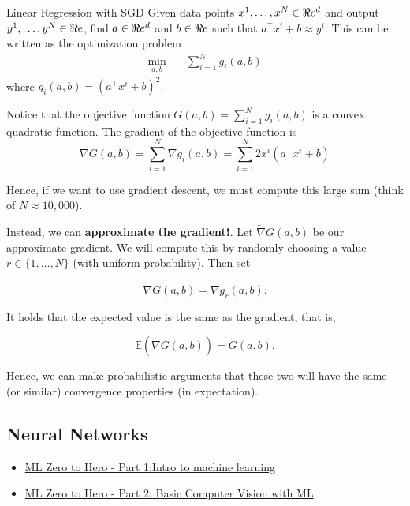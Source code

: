 \begin{example}{Linear Regression with SGD}{}
Given data points $x^1, \dots, x^N \in \Re e^d$ and output $y^1, \dots, y^N \in \Re e$, find $a \in \Re e^d$ and $b \in \Re e$ such that $a^\top x^i + b \approx y^i$.   This can be written as the optimization problem 
\begin{equation}
\begin{array}{rl}
\min_{a,b} \quad & \sum_{i=1}^N g_i(a,b)
\end{array}
\end{equation}
where $g_i(a,b) = (a^\top x^i + b)^2$.   

Notice that the objective function $G(a,b) = \sum_{i=1}^N g_i(a,b)$  is a convex quadratic function.  The gradient of the objective function is 
$$
\nabla G(a,b) = \sum_{i=1}^N \nabla g_i(a,b) = \sum_{i=1}^N 2x^i (a^\top x^i + b)
$$

Hence, if we want to use gradient descent, we must compute this large sum (think of $N \approx 10,000$).  

Instead, we can \textbf{approximate the gradient!}.  Let $\tilde \nabla G(a,b)$ be our approximate gradient.  We will compute this by randomly choosing a value $r \in \{1, \dots, N\}$ (with uniform probability).  Then set

$$
\tilde \nabla G(a,b) = \nabla g_r(a,b).
$$

It holds that the expected value is the same as the gradient, that is,

$$
\mathbb{E}(\tilde \nabla G(a,b)) = G(a,b).
$$


Hence, we can make probabilistic arguments that these two will have the same (or similar) convergence properties (in expectation).
\end{example}

\subsection{Neural Networks}

\begin{resource}
\begin{itemize}
\item \href{https://www.youtube.com/watch?v=KNAWp2S3w94&feature=emb_logo&ab_channel=TensorFlow}{ML Zero to Hero - Part 1:Intro to machine learning}
\item \href{https://www.youtube.com/watch?v=bemDFpNooA8&ab_channel=TensorFlow}{ML Zero to Hero - Part 2: Basic Computer Vision with ML}
\end{itemize}
\end{resource}



